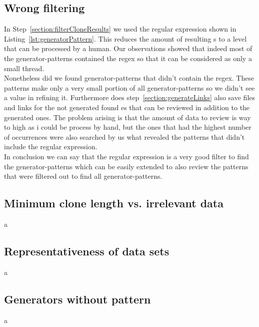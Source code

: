\subsection{Wrong filtering}
In Step~\ref{section:filterCloneResults} we used the regular expression shown in Listing~\ref{lst:generatorPattern}. This reduces the amount of resulting s to a level that can be processed by a human. Our observations showed that indeed most of the generator-patterns contained the regex so that it can be considered as only a small thread.\\
Nonetheless did we found generator-patterns that didn't contain the regex. These patterns make only a very small portion of all generator-patterns so we didn't see a value in refining it. Furthermore does step~\ref{section:generateLinks} also save files and links for the not generated found es that can be reviewed in addition to the generated ones. The problem arising is that the amount of data to review is way to high as i could be process by hand, but the ones that had the highest number of occurrences were also searched by us what revealed the patterns that didn't include the regular expression.\\
In conclusion we can say that the regular expression is a very good filter to find the generator-patterns which can be easily extended to also review the patterns that were filtered out to find all generator-patterns.

\subsection{Minimum clone length vs. irrelevant data}
a
\subsection{Representativeness of data sets}
a
\subsection{Generators without pattern}
a